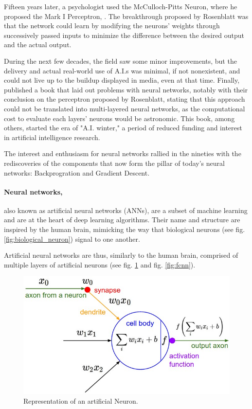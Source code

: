 Fifteen years later, a psychologist used the McCulloch-Pitts Neuron, where he
proposed the Mark I Perceptron, \cite{brain_perceptron_1958}. The breakthrough
proposed by Rosenblatt was that the network could learn by modifying the
neurons' weights through successively passed inputs to minimize the difference
between the desired output and the actual output.

During the next few decades, the field saw some minor improvements, but the
delivery and actual real-world use of A.I.s was minimal, if not nonexistent, and
could not live up to the buildup displayed in media, even at that time. Finally,
\cite{minsky_perceptrons_1969} published a book that laid out problems with
neural networks, notably with their conclusion on the perceptron proposed by
Rosenblatt, stating that this approach could not be translated into
multi-layered neural networks, as the computational cost to evaluate each
layers' neurons would be astronomic. This book, among others, started the era of
"A.I. winter," a period of reduced funding and interest in artificial
intelligence research.

The interest and enthusiasm for neural networks rallied in the nineties with the
rediscoveries of the components that now form the pillar of today's neural
networks: Backprogration and Gradient Descent.


\paragraph{Neural networks,} also known as artificial neural networks (ANNs),
are a subset of machine learning and are at the heart of deep learning
algorithms. Their name and structure are inspired by the human brain, mimicking
the way that biological neurons (see fig. \ref{fig:biological_neuron}) signal to
one another.

Artificial neural networks are thus, similarly to the human brain, comprised of
multiple layers of artificial neurons (see fig. \ref{fig:artificial_neuron} and
fig. \ref{fig:fcnn}).

\begin{figure}[ht]
    \includegraphics[clip,width=1\columnwidth]{Figures/related/artificial_neuron.jpeg}
    \caption{ Representation of an artificial Neuron. }
    \label{fig:artificial_neuron}
\end{figure}

